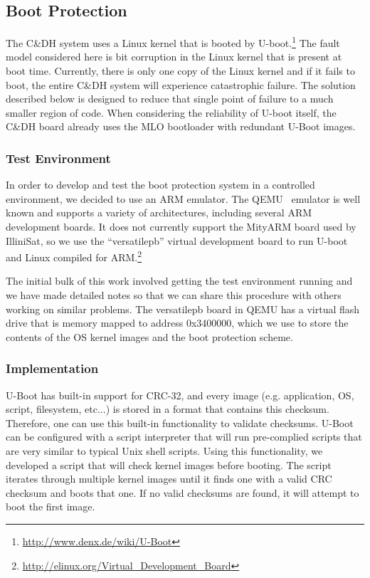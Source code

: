 \subsection{Boot Protection}
The C\&DH system uses a Linux kernel that is booted by
U-boot.\footnote{\url{http://www.denx.de/wiki/U-Boot}} The fault model
considered here is bit corruption in the Linux kernel that is present at boot
time.  Currently, there is only one copy of the Linux kernel and if it fails to
boot, the entire C\&DH system will experience catastrophic failure.  The
solution described below is designed to reduce that single point of failure to a
much smaller region of code.  When considering the reliability of U-boot itself,
the C\&DH board already uses the MLO bootloader with redundant U-Boot images.

\subsubsection{Test Environment}
In order to develop and test the boot protection system in a controlled
environment, we decided to use an ARM emulator.  The QEMU~\cite{bellard2005qemu}
emulator is well known and supports a variety of architectures, including
several ARM development boards.  It does not currently support the MityARM board
used by IlliniSat, so we use the ``versatilepb'' virtual development board to
run U-boot and Linux compiled for
ARM.\footnote{\url{http://elinux.org/Virtual_Development_Board}}

The initial bulk of this work involved getting the test environment running and
we have made detailed notes so that we can share this procedure with others
working on similar problems.  The versatilepb board in QEMU has a virtual flash
drive that is memory mapped to address 0x3400000, which we use to store the
contents of the OS kernel images and the boot protection scheme.

\subsubsection{Implementation}
U-Boot has built-in support for CRC-32, and every image (e.g. application, OS,
script, filesystem, etc...) is stored in a format that contains this checksum.
Therefore, one can use this built-in functionality to validate checksums.
U-Boot can be configured with a script interpreter that will run pre-complied
scripts that are very similar to typical Unix shell scripts. Using this
functionality, we developed a script that will check kernel images before
booting. The script iterates through multiple kernel images until it finds one
with a valid CRC checksum and boots that one.  If no valid checksums are found,
it will attempt to boot the first image.  

